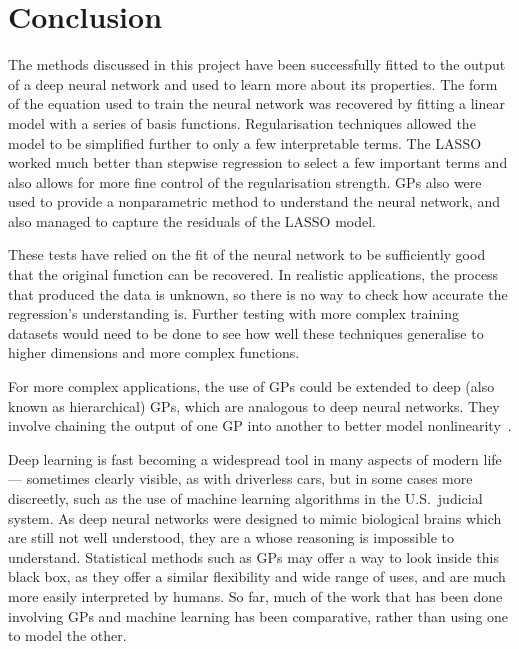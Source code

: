 
\chapter{Conclusion}

The methods discussed in this project have been successfully fitted to the output of a deep neural network and used to learn more about its properties.
The form of the equation used to train the neural network was recovered by fitting a linear model with a series of basis functions.
Regularisation techniques allowed the model to be simplified further to only a few interpretable terms.
The \ac{LASSO} worked much better than stepwise regression to select a few important terms and also allows for more fine control of the regularisation strength.
\acp{GP} also were used to provide a nonparametric method to understand the neural network, and also managed to capture the residuals of the \ac{LASSO} model.

These tests have relied on the fit of the neural network to be sufficiently good that the original function can be recovered.
In realistic applications, the process that produced the data is unknown, so there is no way to check how accurate the regression's understanding is.
Further testing with more complex training datasets would need to be done to see how well these techniques generalise to higher dimensions and more complex functions.

For more complex applications, the use of \acp{GP} could be extended to deep (also known as hierarchical) \acp{GP}, which are analogous to deep neural networks.
They involve chaining the output of one \ac{GP} into another to better model nonlinearity~\autocite{damianou2013}.

Deep learning is fast becoming a widespread tool in many aspects of modern life --- sometimes clearly visible, as with driverless cars, but in some cases more discreetly, such as the use of machine learning algorithms in the U.S.\ judicial system.
As deep neural networks were designed to mimic biological brains which are still not well understood, they are a  whose reasoning is impossible to understand.
Statistical methods such as \acp{GP} may offer a way to look inside this black box, as they offer a similar flexibility and wide range of uses, and are much more easily interpreted by humans.
So far, much of the work that has been done involving \acp{GP} and machine learning has been comparative, rather than using one to model the other.
